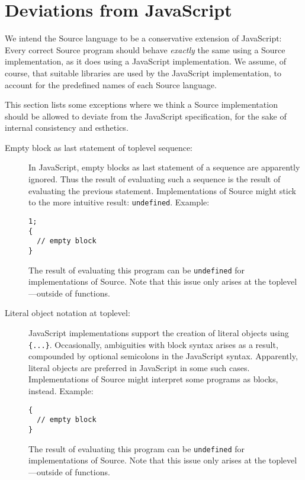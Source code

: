 \section*{Deviations from JavaScript}

We intend the 
Source language to be a conservative extension
of JavaScript: Every correct
Source program should behave \emph{exactly} the same
using a Source implementation, as it does using a JavaScript
implementation. We assume, of course, that suitable libraries are
used by the JavaScript implementation, to account for the predefined names
of each Source language.

This section lists some exceptions where we think a Source implementation
should be allowed to deviate from the JavaScript specification, for the
sake of internal consistency and esthetics.

\begin{description}
\item[Empty block as last statement of toplevel sequence:] In JavaScript,
  empty blocks as last statement of a sequence are apparently
  ignored. Thus the result of evaluating such a sequence is the
  result of evaluating the previous statement. Implementations
  of Source might stick to the more intuitive result: \texttt{undefined}.
  Example:
  \begin{lstlisting}
1;
{
  // empty block
}
  \end{lstlisting}
  The result of evaluating this program can be \texttt{undefined}
  for implementations of Source. Note that this issue only arises
  at the toplevel---outside of functions.
\item[Literal object notation at toplevel:] JavaScript implementations support
  the creation of literal objects using \verb#{...}#. Occasionally,
  ambiguities with block syntax arises as a result, compounded by
  optional semicolons in the JavaScript syntax. Apparently,
  literal objects are preferred in JavaScript in some such cases.
  Implementations
  of Source might interpret some programs as blocks, instead. Example:
  \begin{lstlisting}
{
  // empty block
}    
  \end{lstlisting}
  The result of evaluating this program can be \texttt{undefined}
  for implementations of Source.
  Note that this issue only arises
  at the toplevel---outside of functions.  
\end{description}
